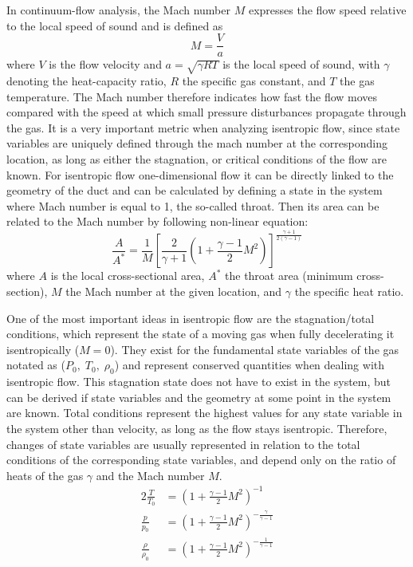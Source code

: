 	In continuum-flow analysis, the Mach number $M$ expresses the flow speed relative to the local speed of sound and is defined as
	\begin{equation}
		M = \frac{V}{a}
		\label{eq:mach-number}
	\end{equation}
	where $V$ is the flow velocity and $a = \sqrt{\gamma R T}$ is the local speed of sound, with $\gamma$ denoting the heat-capacity ratio, $R$ the specific gas constant, and $T$ the gas temperature.
	The Mach number therefore indicates how fast the flow moves compared with the speed at which small pressure disturbances propagate through the gas.
	It is a very important metric when analyzing isentropic flow, since state variables are uniquely defined through the mach number at the corresponding location, as long as either the stagnation, or critical conditions of the flow are known.
	For isentropic flow one-dimensional flow it can be directly linked to the geometry of the duct and can be calculated by defining a state in the system where Mach number is equal to 1, the so-called throat.
	Then its area can be related to the Mach number by following non-linear equation:
	\begin{equation}
		\frac{A}{A^*} = \frac{1}{M} \left[ \frac{2}{\gamma + 1} \left( 1 + \frac{\gamma - 1}{2} M^2 \right) \right]^{\frac{\gamma + 1}{2(\gamma - 1)}}
		\label{eq:area_ratio_mach}
	\end{equation}
	where $A$ is the local cross-sectional area, $A^*$ the throat area (minimum cross-section), $M$ the Mach number at the given location, and $\gamma$ the specific heat ratio.

	One of the most important ideas in isentropic flow are the stagnation/total conditions, which represent the state of a moving gas when fully decelerating it isentropically ($M = 0$).
	They exist for the fundamental state variables of the gas notated as ($P_0,\;T_0,\;\rho_0$) and represent conserved quantities when dealing with isentropic flow.
	This stagnation state does not have to exist in the system, but can be derived if state variables and the geometry at some point in the system are known.
	Total conditions represent the highest values for any state variable in the system other than velocity, as long as the flow stays isentropic.
	Therefore, changes of state variables are usually represented in relation to the total conditions of the corresponding state variables, and depend only on the ratio of heats of the gas $\gamma$ and the Mach number $M$.
	\begin{alignat}{2}
	    \frac{T}{T_0}   & = \left( 1 + \frac{\gamma - 1}{2} M^2 \right)^{-1} \label{eq:total_relation_T}\\
	    \frac{p}{p_0}   & = \left( 1 + \frac{\gamma - 1}{2} M^2 \right)^{-\frac{\gamma}{\gamma - 1}} \label{eq:total_relation_p}\\
	    \frac{\rho}{\rho_0} & = \left( 1 + \frac{\gamma - 1}{2} M^2 \right)^{-\frac{1}{\gamma - 1}} \label{eq:total_relation_rho}
	\end{alignat}

